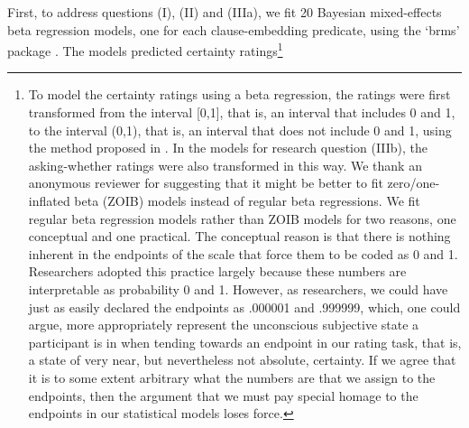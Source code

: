 \documentclass[11pt,fleqn]{article}
\newcommand{\6}{\mbox{$[\hspace*{-.6mm}[$}}
\newcommand{\9}{\mbox{$]\hspace*{-.6mm}]$}}
\begin{document}
First, to address questions (I), (II) and (IIIa), we fit 20 Bayesian mixed-effects beta regression models, one for each clause-embedding predicate, using the `brms' package \citep{buerkner2017}. The models predicted certainty ratings\footnote{To model the certainty ratings using a beta regression, the ratings were first transformed from the interval [0,1], that is, an interval that includes 0 and 1,  to the interval (0,1), that is, an interval that does not include 0 and 1, using the method proposed in \cite{smithson-verkuilen2006}. In the models for research question (IIIb), the asking-whether ratings were also transformed in this way. We thank an anonymous reviewer for suggesting that it might be better to fit zero/one-inflated beta (ZOIB) models instead of regular beta regressions. We fit regular beta regression models rather than ZOIB models for two reasons, one conceptual and one practical. The conceptual reason is that there is nothing inherent in the endpoints of the scale that force them to be coded as 0 and 1. Researchers adopted this practice largely because these numbers are interpretable as probability 0 and 1. However, as researchers, we could have just as easily declared the endpoints as .000001 and .999999, which, one could argue, more appropriately represent the unconscious subjective state a participant is in when tending towards an endpoint in our rating task, that is, a state of very near, but nevertheless not absolute, certainty. If we agree that it is to some extent arbitrary what the numbers are that we assign to the endpoints, then the argument that we must pay special homage to the endpoints in our statistical models loses force. 

}
\end{document}
